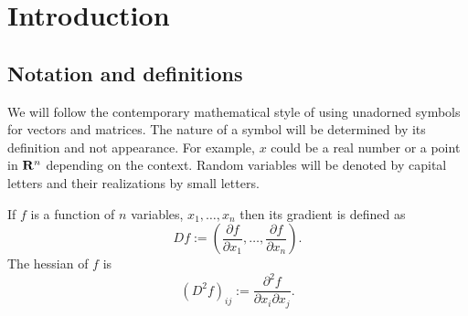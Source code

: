 \chapter{Introduction}\label{c1}
\section{Notation and definitions}\label{c1s1}
We will follow the contemporary mathematical style of using unadorned symbols for vectors and
matrices. The nature of a symbol will be determined by its definition and not appearance. For
example, $x$ could be a real number or a point in $\mathbf{R}^n$ depending on the context. Random
variables will be denoted by capital letters and their realizations by small letters.

If $f$ is a function of $n$ variables, $x_1, \ldots, x_n$ then its gradient is defined as
\begin{equation}\label{c1s1e1}
Df := \left(\frac{\partial f}{\partial x_1}, \ldots, \frac{\partial f}{\partial x_n}\right).
\end{equation}
The hessian of $f$ is
\begin{equation}\label{c1s1e2}
(D^2 f)_{ij} := \frac{\partial^2 f}{\partial x_i \partial x_j}.
\end{equation}

